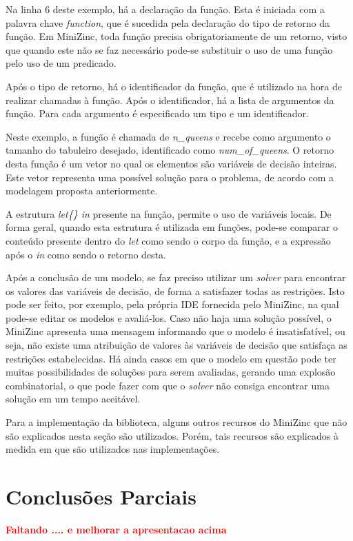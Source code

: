 


Na linha 6 deste exemplo, há a declaração da função. Esta é iniciada com a palavra chave \textit{function}, que é sucedida pela declaração do tipo de retorno da função. Em MiniZinc, toda função precisa obrigatoriamente de um retorno, visto que quando este não se faz necessário pode-se substituir o uso de uma função pelo uso de um predicado.

Após o tipo de retorno, há o identificador da função, que é utilizado na hora de realizar chamadas à função. Após o identificador, há a lista de argumentos da função. Para cada argumento é especificado um tipo e um identificador.

Neste exemplo, a função é chamada de \textit{n\_queens} e recebe como argumento o tamanho do tabuleiro desejado, identificado como \textit{num\_of\_queens}. O retorno desta função é um vetor no qual os elementos são variáveis de decisão inteiras. Este vetor representa uma possível solução para o problema, de acordo com a modelagem proposta anteriormente.

A estrutura \textit{let\{\} in} presente na função, permite o uso de variáveis locais. De forma geral, quando esta estrutura é utilizada em funções, pode-se comparar o conteúdo presente dentro do \textit{let} como sendo o corpo da função, e a expressão após o \textit{in} como sendo o retorno desta.

Após a conclusão de um modelo, se faz preciso utilizar um \textit{solver} para encontrar os valores das variáveis de decisão, de forma a satisfazer todas as restrições. Isto pode ser feito, por exemplo, pela própria IDE fornecida pelo MiniZinc, na qual pode-se editar os modelos e avaliá-los. Caso não haja uma solução possível, o MiniZinc apresenta uma mensagem informando que o modelo é insatisfatível, ou seja, não existe uma atribuição de valores às variáveis de decisão que satisfaça as restrições estabelecidas. Há ainda casos em que o modelo em questão pode ter muitas possibilidades de soluções para serem avaliadas, gerando uma explosão combinatorial, o que pode fazer com que o \textit{solver} não consiga encontrar uma solução em um tempo aceitável.

Para a implementação da biblioteca, alguns outros recursos do MiniZinc que não são explicados nesta seção são utilizados. Porém, tais recursos são explicados à medida em que são utilizados nas implementações.




\section{Conclusões Parciais}
{\bf \textcolor{red}{Faltando .... e melhorar a apresentacao acima}}
